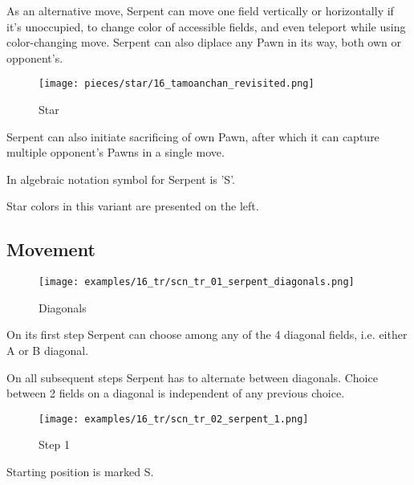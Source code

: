 As an alternative move, Serpent can move one field vertically or horizontally
if it's unoccupied, to change color of accessible fields, and even teleport
while using color-changing move. Serpent can also diplace any Pawn in its way,
both own or opponent's.

\noindent
\begin{wrapfigure}{l}{0.4\textwidth}
\centering
\texttt{[image: pieces/star/16\_tamoanchan\_revisited.png]}
\caption{Star}
\label{fig:star/16_tamoanchan_revisited}
\end{wrapfigure}
Serpent can also initiate sacrificing of own Pawn, after which it can capture
multiple opponent's Pawns in a single move.

In algebraic notation symbol for Serpent is 'S'.

Star colors in this variant are presented on the left.

\clearpage %

\subsection*{Movement}
\label{sec:Tamoanchan Revisited/Serpent/Movement}

\noindent
\begin{wrapfigure}[8]{l}{0.4\textwidth}
\centering
\texttt{[image: examples/16\_tr/scn\_tr\_01\_serpent\_diagonals.png]}
\caption{Diagonals}
\label{fig:scn_tr_01_serpent_diagonals}
\end{wrapfigure}
On its first step Serpent can choose among any of the 4 diagonal fields,
i.e. either A or B diagonal.

On all subsequent steps Serpent has to alternate between diagonals.
Choice between 2 fields on a diagonal is independent of any previous choice.

\vspace*{0.04\textheight}
\noindent
\begin{wrapfigure}[5]{l}{0.4\textwidth}
\centering
\texttt{[image: examples/16\_tr/scn\_tr\_02\_serpent\_1.png]}
\caption{Step 1}
\label{fig:scn_tr_02_serpent_1}
\end{wrapfigure}
Starting position is marked S.

